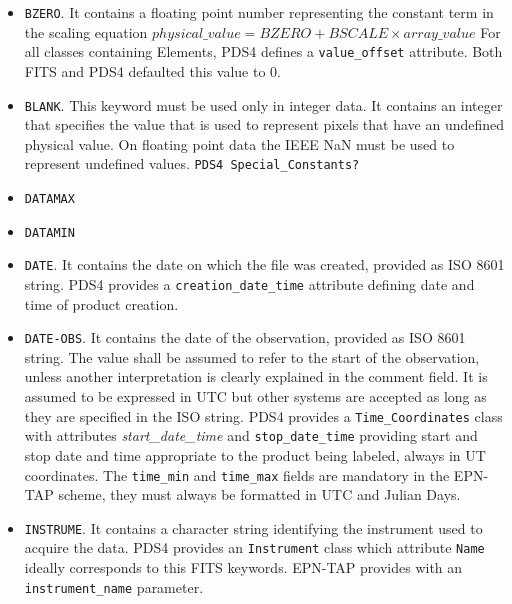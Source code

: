 \begin{itemize}
\item{\texttt{BZERO}.
It contains a floating point number representing the constant term in the
scaling equation $physical\_value = BZERO + BSCALE \times array\_value$
For all classes containing Elements, PDS4 defines a \texttt{value\_offset}
attribute. Both FITS and PDS4 defaulted this value to $0$.}

\item{\texttt{BLANK}.
This keyword must be used only in integer data.
It contains an integer that specifies the value that is used to
represent pixels that have an undefined physical value.
On floating point data the IEEE NaN must be used to represent undefined values.  
\texttt{PDS4 Special\_Constants?}}

\item{\texttt{DATAMAX}}
\item{\texttt{DATAMIN}}

\item{\texttt{DATE}.
It contains the date on which the file was created, provided as ISO 8601
string.
PDS4 provides a \texttt{creation\_date\_time} attribute defining date
and time of product creation.}

\item{\texttt{DATE-OBS}.
It contains the date of the observation, provided as ISO 8601
string. The value shall be assumed to refer to the start of the observation,
unless another interpretation is clearly explained in the comment field.
It is assumed to be expressed in UTC but other systems are accepted as long as they
are specified in the ISO string. 
PDS4 provides a \texttt{Time\_Coordinates} class with attributes
\textit{start\_date\_time} and \texttt{stop\_date\_time} providing start and
stop date and time appropriate to the product being labeled, always in UT
coordinates.
The \texttt{time\_min} and \texttt{time\_max} fields are mandatory in the EPN-TAP scheme,
they must always be formatted in UTC and Julian Days.}
% 
% 

\item{\texttt{INSTRUME}.
It contains a character string identifying the instrument used to acquire the data.
PDS4 provides an \texttt{Instrument} class which attribute \texttt{Name} ideally corresponds
to this FITS keywords.
EPN-TAP provides with an \texttt{instrument\_name} parameter.}


\end{itemize}
